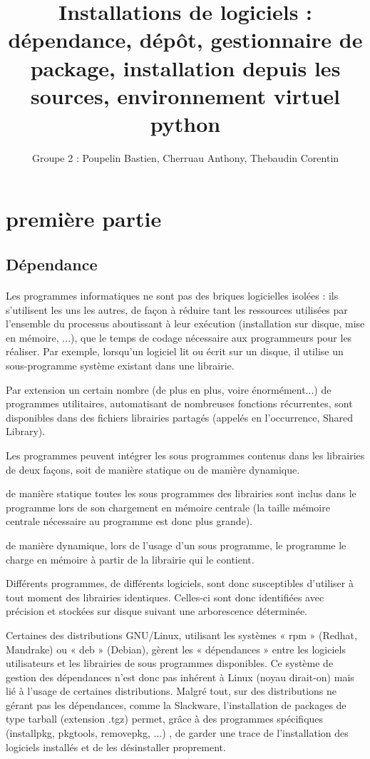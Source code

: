 \documentclass[a4paper,10pt]{article}
\title{\textbf{Installations de logiciels :} \\ dépendance, dépôt, gestionnaire de package, installation depuis les sources, environnement virtuel python}
\author{Groupe 2 : Poupelin Bastien, Cherruau Anthony, Thebaudin Corentin}
\date{}
\begin{document}
\maketitle

\tableofcontents

\clearpage

\section{première partie}

\subsection{Dépendance}
\paragraph{}
Les programmes informatiques ne sont pas des briques logicielles isolées : ils s’utilisent les uns les autres, de façon à réduire tant les ressources utilisées par l’ensemble du processus aboutissant à leur exécution (installation sur disque, mise en mémoire, ...), que le temps de codage nécessaire aux programmeurs pour les réaliser. Par exemple, lorsqu’un logiciel lit ou écrit sur un disque, il utilise un sous-programme système existant dans une librairie.

Par extension un certain nombre (de plus en plus, voire énormément...) de programmes utilitaires, automatisant de nombreuses fonctions récurrentes, sont disponibles dans des fichiers librairies partagés (appelés en l’occurrence, Shared Library).

Les programmes peuvent intégrer les sous programmes contenus dans les librairies de deux façons, soit de manière statique ou de manière dynamique.

    de manière statique toutes les sous programmes des librairies sont inclus dans le programme lors de son chargement en mémoire centrale (la taille mémoire centrale nécessaire au programme est donc plus grande).

    de manière dynamique, lors de l’usage d’un sous programme, le programme le charge en mémoire à partir de la librairie qui le contient.

Différents programmes, de différents logiciels, sont donc susceptibles d’utiliser à tout moment des librairies identiques. Celles-ci sont donc identifiées avec précision  et stockées sur disque suivant une arborescence déterminée.

Certaines des distributions GNU/Linux, utilisant les systèmes « rpm » (Redhat, Mandrake) ou « deb » (Debian), gèrent les « dépendances » entre les logiciels utilisateurs et les librairies de sous programmes disponibles. Ce système de gestion des dépendances n’est donc pas inhérent à Linux (noyau dirait-on) mais lié à l’usage de certaines distributions. Malgré tout, sur des distributions ne gérant pas les dépendances, comme la Slackware, l’installation de packages de type tarball (extension .tgz) permet, grâce à des programmes spécifiques (installpkg, pkgtools, removepkg, ...) , de garder une trace de l’installation des logiciels installés et de les désinstaller proprement.
\end{document}
